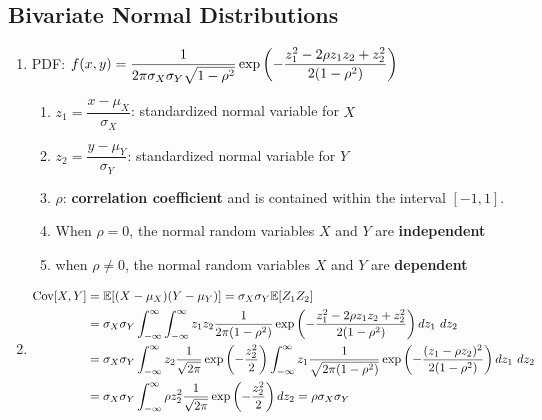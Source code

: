 \subsection{Bivariate Normal Distributions}

\begin{enumerate}[series=binvar-normal]
    \item PDF:
    $
        f (x, y)
        = \dfrac{1}{ 2\pi\sigma_X \sigma_Y \sqrt{1 - \rho^2} }
        \exp \left(
            - \dfrac{z^2_1 - 2\rho z_1z_2 + z^2_2 }{2(1 - \rho^2)}
        \right)
    $
    \hfill \cite{statistics/book/Statistics-for-Data-Scientists/Maurits-Kaptein}
    \begin{enumerate}
        \item $z_1 = \dfrac{x - \mu_X}{\sigma_X}$: standardized normal variable for $X$
        \hfill \cite{statistics/book/Statistics-for-Data-Scientists/Maurits-Kaptein}

        \item $z_2 = \dfrac{y - \mu_Y}{\sigma_Y}$: standardized normal variable for $Y$
        \hfill \cite{statistics/book/Statistics-for-Data-Scientists/Maurits-Kaptein}

        \item $\rho$: \textbf{correlation coefficient} and is contained within the interval $[-1, 1]$.
        \hfill \cite{statistics/book/Statistics-for-Data-Scientists/Maurits-Kaptein}

        \item When $\rho = 0$, the normal random variables $X$ and $Y$ are \textbf{independent}
        \hfill \cite{statistics/book/Statistics-for-Data-Scientists/Maurits-Kaptein}

        \item when $\rho \neq 0$, the normal random variables $X$ and $Y$ are \textbf{dependent}
        \hfill \cite{statistics/book/Statistics-for-Data-Scientists/Maurits-Kaptein}
    \end{enumerate}

    \item
    $
        \begin{aligned}
            \tCov[X, Y]
            & = \mbbE[(X - \mu _X )(Y - \mu _Y )]
            = \sigma _X \sigma _Y \mbbE[Z_1 Z_2] \\
            &= \sigma _X \sigma _Y \dint^\infty_{-\infty} \dint^\infty_{-\infty} z_1z_2 \dfrac{1}{2\pi (1-\rho^2)} \exp \dParenBrac{ - \dfrac{z^2_1-2\rho z_1 z_2+z^2_2} {2(1-\rho^2)} } dz_1\ dz_2\\
            &= \sigma _X \sigma _Y \dint^\infty_{-\infty} z_2 \dfrac{1}{\sqrt{2\pi}}  \exp \dParenBrac{ - \dfrac{z^2_2} {2} } \dint^\infty_{-\infty} z_1 \dfrac{1}{\sqrt{2\pi (1-\rho^2)}} \exp \dParenBrac{ - \dfrac{(z_1-\rho z_2)^2 }{2(1-\rho^2)} } dz_1\ dz_2 \\
            &= \sigma_X \sigma_Y \dint^\infty_{-\infty} \rho z^2_2 \dfrac{1}{\sqrt{2\pi}}  \exp \dParenBrac{ - \dfrac{z^2_2}{ 2} } dz_2
            = \rho \sigma_X \sigma_Y
        \end{aligned}
    $
    \hfill \cite{statistics/book/Statistics-for-Data-Scientists/Maurits-Kaptein}


\end{enumerate}
